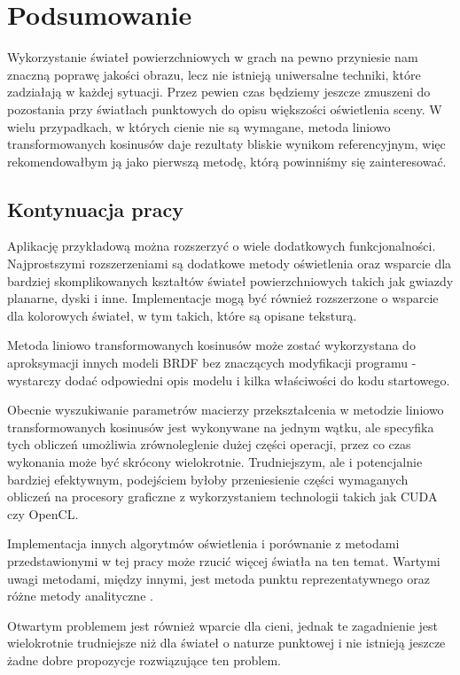 \documentclass[../main.tex]{subfiles}
\begin{document}
\chapter{Podsumowanie}

Wykorzystanie świateł powierzchniowych w grach na pewno przyniesie nam znaczną poprawę jakości obrazu, lecz nie istnieją uniwersalne techniki, które zadziałają w każdej sytuacji. Przez pewien czas będziemy jeszcze zmuszeni do pozostania przy światłach punktowych do opisu większości oświetlenia sceny. W wielu przypadkach, w których cienie nie są wymagane, metoda liniowo transformowanych kosinusów daje rezultaty bliskie wynikom referencyjnym, więc rekomendowałbym ją jako pierwszą metodę, którą powinniśmy się zainteresować.

\section{Kontynuacja pracy}

Aplikację przykładową można rozszerzyć o wiele dodatkowych funkcjonalności. Najprostszymi rozszerzeniami są dodatkowe metody oświetlenia oraz wsparcie dla bardziej skomplikowanych kształtów świateł powierzchniowych takich jak gwiazdy planarne, dyski i inne. Implementacje mogą być również rozszerzone o wsparcie dla kolorowych świateł, w tym takich, które są opisane teksturą.

Metoda liniowo transformowanych kosinusów może zostać wykorzystana do aproksymacji innych modeli BRDF bez znaczących modyfikacji programu - wystarczy dodać odpowiedni opis modelu i kilka właściwości do kodu startowego.

Obecnie wyszukiwanie parametrów macierzy przekształcenia w metodzie liniowo transformowanych kosinusów jest wykonywane na jednym wątku, ale specyfika tych obliczeń umożliwia zrównoleglenie dużej części operacji, przez co czas wykonania może być skrócony wielokrotnie. Trudniejszym, ale i potencjalnie bardziej efektywnym, podejściem byłoby przeniesienie części wymaganych obliczeń na procesory graficzne z wykorzystaniem technologii takich jak CUDA czy OpenCL.

Implementacja innych algorytmów oświetlenia i porównanie z metodami przedstawionymi w tej pracy może rzucić więcej światła na ten temat. Wartymi uwagi metodami, między innymi, jest metoda punktu reprezentatywnego \cite{pbr_ue4, Drobot} oraz różne metody analityczne \cite{Snyder, LecoqAnalyticApproximationsForALS}.

Otwartym problemem jest również wparcie dla cieni, jednak te zagadnienie jest wielokrotnie trudniejsze niż dla świateł o naturze punktowej i nie istnieją jeszcze żadne dobre propozycje rozwiązujące ten problem.
\end{document}
